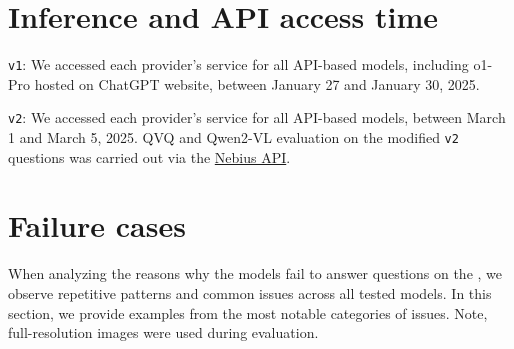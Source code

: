 \section{Inference and API access time}
\label{app:api_access}

\benchmarkName \texttt{v1}: We accessed each provider’s service for all API-based models, including o1-Pro hosted on ChatGPT website, between January 27 and January 30, 2025.

\benchmarkName \texttt{v2}:  We accessed each provider’s service for all API-based models, between March 1 and March 5, 2025. QVQ and Qwen2-VL evaluation on the modified \texttt{v2} questions was carried out via the \href{https://docs.nebius.com/studio/inference/api}{Nebius API}.


\clearpage
\section{Failure cases}
\label{sec:appendix_failure_modes}
When analyzing the reasons why the models fail to answer questions on the \benchmarkName, we observe repetitive patterns and common issues across all tested models. In this section, we provide examples from the most notable categories of issues. Note, full-resolution images were used during evaluation.



